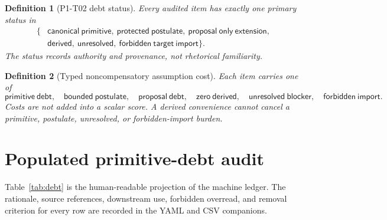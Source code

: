 \documentclass[11pt]{article}
\newtheorem{definition}{Definition}
\begin{document}
\begin{definition}[P1-T02 debt status]
Every audited item has exactly one primary status in
\[
\begin{split}
\{&\mathsf{canonical\ primitive},\ \mathsf{protected\ postulate},
\ \mathsf{proposal\ only\ extension},\\
  &\mathsf{derived},\ \mathsf{unresolved},
\ \mathsf{forbidden\ target\ import}\}.
\end{split}
\]
The status records authority and provenance, not rhetorical familiarity.
\end{definition}

\begin{definition}[Typed noncompensatory assumption cost]
Each item carries one of
\[
 \mathsf{primitive\ debt},\quad
 \mathsf{bounded\ postulate},\quad
 \mathsf{proposal\ debt},\quad
 \mathsf{zero\ derived},\quad
 \mathsf{unresolved\ blocker},\quad
 \mathsf{forbidden\ import}.
\]
Costs are not added into a scalar score. A derived convenience cannot cancel
a primitive, postulate, unresolved, or forbidden-import burden.
\end{definition}

\section{Populated primitive-debt audit}

Table~\ref{tab:debt} is the human-readable projection of the machine ledger.
The rationale, source references, downstream use, forbidden overread, and
removal criterion for every row are recorded in the YAML and CSV companions.
\end{document}
